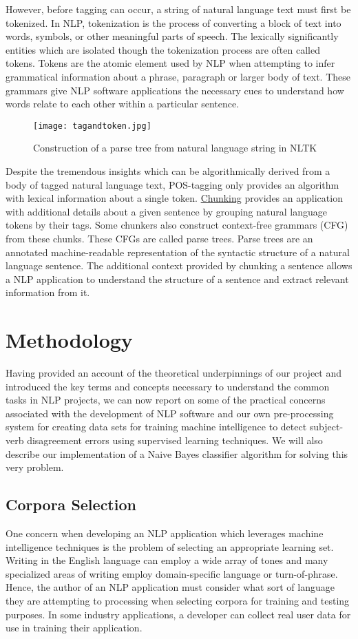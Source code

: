 \documentclass{article}
\begin{document}
However, before tagging can occur, a string of natural language text must first be tokenized. In NLP, tokenization is the process of converting a block of text into words, symbols, or other meaningful parts of speech. The lexically significantly entities which are isolated though the tokenization process are often called tokens. Tokens are the atomic element used by NLP when attempting to infer grammatical information about a phrase, paragraph or larger body of text. These grammars give NLP software applications the necessary cues to understand how words relate to each other within a particular sentence.
\begin{center}
\begin{figure}[h!]
\centering
\texttt{[image: tagandtoken.jpg]}
\caption{Construction of a parse tree from natural language string in NLTK }
\label{fig:univerise}
\end{figure}
\end{center}
 Despite the tremendous insights which can be algorithmically derived from a body of tagged natural language text, POS-tagging only provides an algorithm with lexical information about a single token. \underline{Chunking} provides an application with additional details about a given sentence by grouping natural language tokens by their tags. Some chunkers also construct context-free grammars (CFG) from these chunks. These CFGs are called parse trees. Parse trees are an annotated machine-readable representation of the syntactic structure of a natural language sentence.
 The additional context provided by chunking a sentence allows a NLP application to \citep{NLTKCH7} understand the structure of a sentence and extract relevant information from it.
\section{Methodology}

Having provided an account of the theoretical underpinnings of our project and introduced the  key terms and concepts necessary to understand the common tasks in NLP projects, we can now report on some of the practical concerns associated with the development of NLP software and our own pre-processing system for creating data sets for training machine intelligence to detect subject-verb disagreement errors using supervised learning techniques. We will also describe our implementation of a Naive Bayes classifier algorithm for solving this very problem.
\subsection{Corpora Selection}
One concern when developing an NLP application which leverages machine intelligence techniques is the problem of selecting an appropriate learning set. Writing in the English language can employ a wide array of tones and many specialized areas of writing employ domain-specific language or turn-of-phrase. Hence, the author of an NLP application must consider what sort of language they are attempting to processing when selecting corpora for training and testing purposes. In some industry applications, a developer can collect real user data for use in training their application. 
\end{document}
